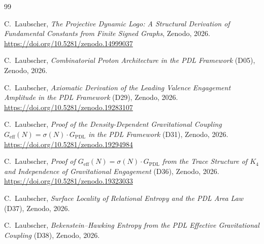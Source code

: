 \documentclass[11pt,a4paper]{article}
\theoremstyle{definition}
\begin{document}
\begin{thebibliography}{99}

C.~Laubscher,
\textit{The Projective Dynamic Logo: A Structural Derivation of
Fundamental Constants from Finite Signed Graphs},
Zenodo, 2026. \url{https://doi.org/10.5281/zenodo.14999037}

C.~Laubscher,
\textit{Combinatorial Proton Architecture in the PDL Framework} (D05),
Zenodo, 2026.

C.~Laubscher,
\textit{Axiomatic Derivation of the Leading Valence Engagement Amplitude
in the PDL Framework} (D29),
Zenodo, 2026. \url{https://doi.org/10.5281/zenodo.19283107}

C.~Laubscher,
\textit{Proof of the Density-Dependent Gravitational Coupling
$G_{\mathrm{eff}}(N)=\sigma(N)\cdot G_{\mathrm{PDL}}$ in the PDL Framework}
(D31), Zenodo, 2026. \url{https://doi.org/10.5281/zenodo.19294984}

C.~Laubscher,
\textit{Proof of $G_{\mathrm{eff}}(N)=\sigma(N)\cdot G_{\mathrm{PDL}}$
from the Trace Structure of $K_4$ and Independence of Gravitational
Engagement} (D36), Zenodo, 2026.
\url{https://doi.org/10.5281/zenodo.19323033}

C.~Laubscher,
\textit{Surface Locality of Relational Entropy and the PDL Area Law}
(D37), Zenodo, 2026.

C.~Laubscher,
\textit{Bekenstein--Hawking Entropy from the PDL Effective Gravitational
Coupling} (D38), Zenodo, 2026.

\end{thebibliography}
\end{document}
